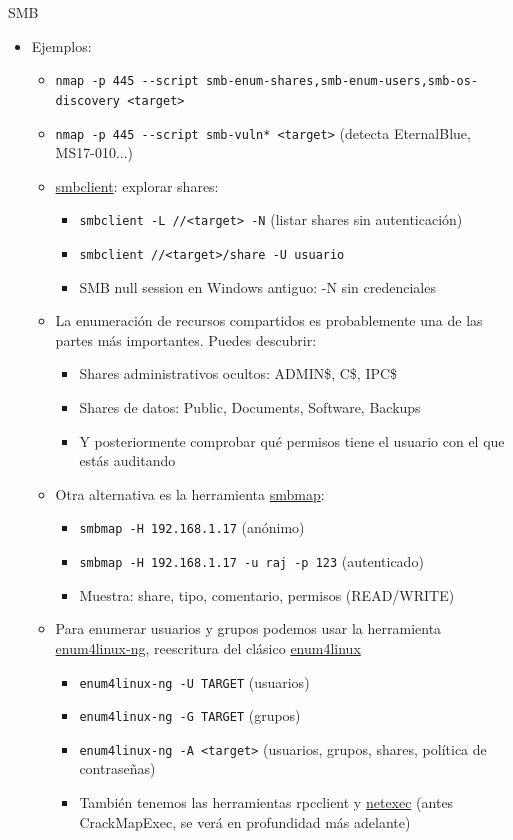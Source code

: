 \documentclass[aspectratio=169,11pt]{beamer}
\newcommand{\cmd}[1]{\texttt{#1}}
\begin{document}
\begin{frame}[allowframebreaks]{SMB}
\small
  \begin{itemize}

  \item Ejemplos:
  \begin{itemize}
  \item \cmd{nmap -p 445 -{}-script smb-enum-shares,smb-enum-users,smb-os-discovery <target>}
  \item \cmd{nmap -p 445 -{}-script smb-vuln* <target>} (detecta EternalBlue, MS17-010...)
  \item \href{https://www.samba.org/samba/docs/current/man-html/smbclient.1.html}{smbclient}: explorar shares:
    \begin{itemize}
    \item \cmd{smbclient -L //<target> -N} (listar shares sin autenticación)
    \item \cmd{smbclient //<target>/share -U usuario}
    \item SMB null session en Windows antiguo: -N sin credenciales
    \end{itemize}
  \item La enumeración de recursos compartidos es probablemente una de las partes más importantes. Puedes descubrir:
    \begin{itemize}
    \item Shares administrativos ocultos: ADMIN\$, C\$, IPC\$
    \item Shares de datos: Public, Documents, Software, Backups
    \item Y posteriormente comprobar qué permisos tiene el usuario con el que estás auditando
    \end{itemize}
  \item Otra alternativa es la herramienta \href{https://github.com/ShawnDEvans/smbmap}{smbmap}:
      \begin{itemize}

  \item \cmd{smbmap -H 192.168.1.17} (anónimo)
  \item \cmd{smbmap -H 192.168.1.17 -u raj -p 123} (autenticado)
  \item Muestra: share, tipo, comentario, permisos (READ/WRITE)
      \end{itemize}

  \item Para enumerar usuarios y grupos podemos usar la herramienta \href{https://github.com/cddmp/enum4linux-ng}{enum4linux-ng}, reescritura del clásico \href{https://github.com/CiscoCXSecurity/enum4linux}{enum4linux}
    \begin{itemize}
    \item \cmd{enum4linux-ng -U TARGET} (usuarios)
    \item \cmd{enum4linux-ng -G TARGET} (grupos)
    \item \cmd{enum4linux-ng -A <target>} (usuarios, grupos, shares, política de contraseñas)
    \item También tenemos las herramientas rpcclient y \href{https://github.com/Pennyw0rth/NetExec}{netexec} (antes CrackMapExec, se verá en profundidad más adelante)
    \end{itemize}



\end{itemize}
\end{itemize}
\end{frame}
\end{document}
